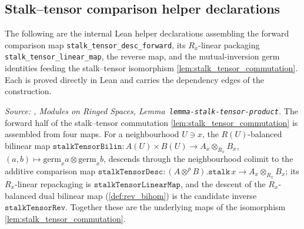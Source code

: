 \subsection{Stalk--tensor comparison helper declarations}
\label{subsec:tensorobj_stalktensor_helpers}

The following are the internal Lean helper declarations assembling the forward
comparison map \texttt{stalk\_tensor\_desc\_forward}, its \(R_x\)-linear packaging
\texttt{stalk\_tensor\_linear\_map}, the reverse map, and the mutual-inversion germ
identities feeding the stalk--tensor isomorphism \cref{lem:stalk_tensor_commutation}.
Each is proved directly in Lean and carries the dependency edges of the construction.

\begin{definition}
  \label{def:stalk_tensor_desc}
  \textit{Source: \cite{stacks-project}, Modules on Ringed Spaces,
  Lemma~\texttt{lemma-stalk-tensor-product}.}
  The forward half of the stalk--tensor commutation \cref{lem:stalk_tensor_commutation}
  is assembled from four maps. For a neighbourhood \(U \ni x\), the \(R(U)\)-balanced
  bilinear map \(\mathtt{stalkTensorBilin}\colon A(U) \times B(U) \to A_x \otimes_{R_x}
  B_x\), \((a,b) \mapsto \mathrm{germ}_x a \otimes \mathrm{germ}_x b\), descends through
  the neighbourhood colimit to the additive comparison map \(\mathtt{stalkTensorDesc}
  \colon (A \otimes^{p} B).\mathtt{stalk}\,x \to A_x \otimes_{R_x} B_x\); its
  \(R_x\)-linear repackaging is \(\mathtt{stalkTensorLinearMap}\), and the descent of the
  \(R_x\)-balanced dual bilinear map (\cref{def:rev_bihom}) is the candidate inverse
  \(\mathtt{stalkTensorRev}\). Together these are the underlying maps of the isomorphism
  \cref{lem:stalk_tensor_commutation}.
\end{definition}
